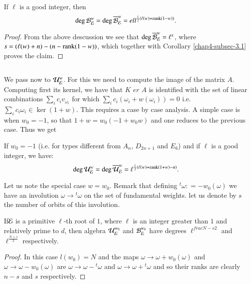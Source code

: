 \begin{theorem*}
If $\ell$ is a good integer, then
$$
\deg\mathcal{B}_{\mathcal{E}}^{w} = \deg\overline{\mathcal{B}}_{\mathcal{E}}^{w} = ell^{\frac{1}{2}(\ell(w)+\operatorname{rank}(1-w))}.
$$
\end{theorem*}

\begin{proof}
From the above descussion we see that $\deg\overline{\mathcal{B}}_{\mathcal{E}}^{w} = \ell^{s}$, where $s = (\ell(w) +n) -(n -\operatorname{rank}(1-w))$, which together with Corollary \ref{chap4-subsec-3.1} proves the claim.
\end{proof}

\subsection{}\label{chap4-subsec-3.5}
We pass now to $\mathcal{U}_{\mathcal{E}}^{w}$. For this we need to compute the image of the matrix $A$. Computing first its kernel, we have that $K$ $er$ $A$ is identified with the set of linear combinations $\sum_{i}c_{i}v_{\omega_{i}}$ for which $\sum_{i}c_{i}(\omega_{i}+w(\omega_{i}))=0$ i.e. $\sum_{i}c_{i}\omega_{i}\in \ker(1 + w)$. This requires a case by case analysis. A simple case is when $w_{0} = -1$, so that $1+w = w_{0}(-1 + w_{0}w)$ and one reduces to the previous case. Thus we get

\begin{prop*}
If $w_{0} =-1$ (i.e. for types different from $A_{n}$, $D_{2n+1}$ and $E_{6}$) and if $\ell$ is a good integer, we have:
$$
\deg\mathcal{U}_{\mathcal{E}}^{w} = \deg\overline{\mathcal{U}}_{\mathcal{E}}^{w} = \ell^{\frac{1}{2}(\ell(w)+\operatorname{rank}(1+w)-n)}.
$$
\end{prop*}

Let us note the special case $w=w_{0}$. Remark that defining ${}^{t}\omega : = -w_{0}(\omega)$ we have an involution $\omega \rightarrow {}^{t}\omega$ on the set of fundamental weights. let us denote by $s$ the number of orbits of this involution.

\begin{theorem*}
If\pageoriginale $\mathcal{E}$ is a primitive $\ell$-th root of $1$, where $\ell$ is an integer greater than $1$ and relatively prime to $d$, then algebra $\mathcal{U}_{\mathcal{E}}^{w_{0}}$ and $\mathcal{B}_{\mathcal{E}}^{w_{0}}$ have degrees $\ell^{frac{N-s}{2}}$ and $\ell^{\frac{N+s}{2}}$ respectively.
\end{theorem*}

\begin{proof}
In this case $l(w_{0}) = N$ and the maps $\omega \rightarrow \omega +w_{0}(\omega)$ and $\omega \rightarrow \omega-w_{0}(\omega)$ are $\omega \rightarrow \omega - {}^{t}\omega$ and $\omega \rightarrow \omega + {}^{t}\omega$ and so their ranks are clearly $n-s$ and $s$ respectively.
\end{proof}


